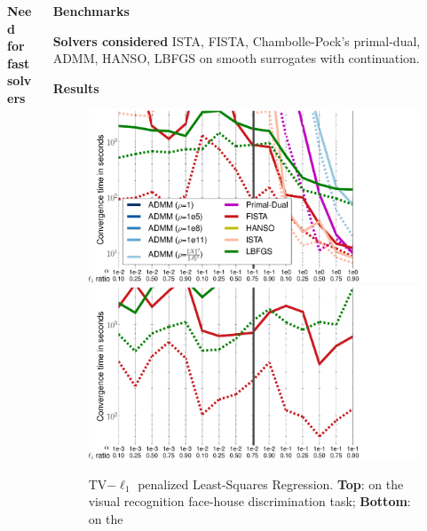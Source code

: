 \documentclass[french]{STIC_poster}
\begin{document}
\begin{frame}[t]
\begin{columns}[t]
\begin{column}{.48\linewidth}
\begin{nbox}[\textwidth]{\textbf{Need for fast solvers}}
                                  \end{nbox}
			\end{column}
			\hfill
			\begin{column}{.48\linewidth}
			  \begin{nbox}[\textwidth]{\textbf{Benchmarks}}
                            \begin{nbox}{\textbf{Solvers considered}}
                              ISTA, FISTA, Chambolle-Pock's primal-dual, ADMM, HANSO, LBFGS on smooth surrogates with continuation.
                            \end{nbox}
                            \begin{nbox}{\textbf{Results}}
                            \begin{figure}
                              \includegraphics[width=1.2\linewidth]{bench/haxby_mse.pdf}%
                              \hspace{-.09\linewidth}%
                              \includegraphics[width=1.2\linewidth]{bench/poldrack_mse.pdf}
                              \caption{TV$-\ell_1$ penalized Least-Squares Regression. \textbf{Top}:
                                on the visual recognition  face-house discrimination task; \textbf{Bottom}: on the
}
\end{figure}
\end{nbox}
\end{nbox}
\end{column}
\end{columns}
\end{frame}
\end{document}
